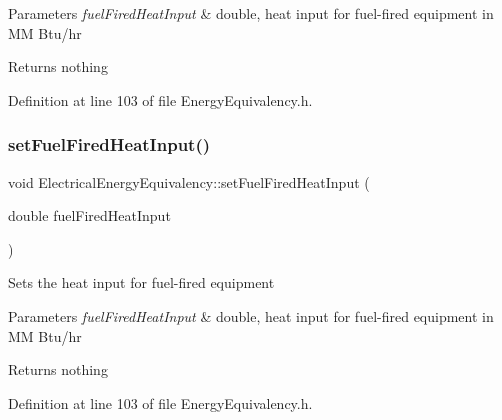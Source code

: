 \begin{DoxyParams}{Parameters}
{\em fuel\+Fired\+Heat\+Input} & double, heat input for fuel-\/fired equipment in MM Btu/hr\\
\hline
\end{DoxyParams}
\begin{DoxyReturn}{Returns}
nothing 
\end{DoxyReturn}


Definition at line 103 of file Energy\+Equivalency.\+h.

\mbox{\label{class_electrical_energy_equivalency_a9daf2b93c52c31cb999e5a9a18f1dd54}} 
\subsubsection{\texorpdfstring{set\+Fuel\+Fired\+Heat\+Input()}{setFuelFiredHeatInput()}\hspace{0.1cm}{\footnotesize\ttfamily [2/3]}}
{\footnotesize\ttfamily void Electrical\+Energy\+Equivalency\+::set\+Fuel\+Fired\+Heat\+Input (\begin{DoxyParamCaption}\item[{double}]{fuel\+Fired\+Heat\+Input }\end{DoxyParamCaption})\hspace{0.3cm}{\ttfamily [inline]}}

Sets the heat input for fuel-\/fired equipment


\begin{DoxyParams}{Parameters}
{\em fuel\+Fired\+Heat\+Input} & double, heat input for fuel-\/fired equipment in MM Btu/hr\\
\hline
\end{DoxyParams}
\begin{DoxyReturn}{Returns}
nothing 
\end{DoxyReturn}


Definition at line 103 of file Energy\+Equivalency.\+h.

\mbox{\label{class_electrical_energy_equivalency_a9daf2b93c52c31cb999e5a9a18f1dd54}} 

